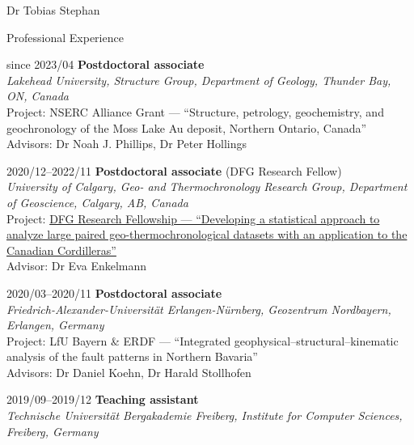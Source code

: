 \documentclass[10pt, paper=letter]{scrartcl} %
\begin{document}
\begin{cv}{Dr Tobias Stephan}
\begin{cvlist}{Professional Experience}
    \item[since 2023/04] \textbf{Postdoctoral associate}\\  
        \textit{Lakehead University, Structure Group, Department of Geology, Thunder Bay, ON, Canada}\\
        Project: NSERC Alliance Grant --- \enquote{Structure, petrology, geochemistry, and geochronology of the Moss Lake Au deposit, Northern Ontario, Canada}\\
        Advisors: Dr Noah J. Phillips, Dr Peter Hollings

\item[2020/12--2022/11] \textbf{Postdoctoral associate} (DFG Research Fellow)\\
    \textit{University of Calgary, Geo- and Thermochronology Research Group, Department of Geoscience, Calgary, AB, Canada}\\
    Project: \href{https://gepris.dfg.de/gepris/projekt/439621066?language=en}{DFG Research Fellowship --- 
    \enquote{Developing a statistical approach to analyze large paired geo-thermochronological datasets with an application to the Canadian Cordilleras}}\\
    Advisor: Dr Eva Enkelmann

    \item[2020/03--2020/11] \textbf{Postdoctoral associate}\\
        \textit{
    Friedrich-Alexander-Universit\"at Erlangen-N\"urnberg, Geozentrum Nordbayern, \mbox{Erlangen}, Germany} \\ Project: LfU Bayern \& ERDF --- \enquote{Integrated geophysical–structural–kinematic analysis of the fault patterns in Northern Bavaria}\\
    Advisors: Dr Daniel Koehn, Dr Harald Stollhofen
    
    \item[2019/09--2019/12] \textbf{Teaching assistant}\\
        \textit{Technische Universit\"at Bergakademie Freiberg, Institute for Computer Sciences, Freiberg, Germany}
        

\end{cvlist}
\end{cv}
\end{document}
